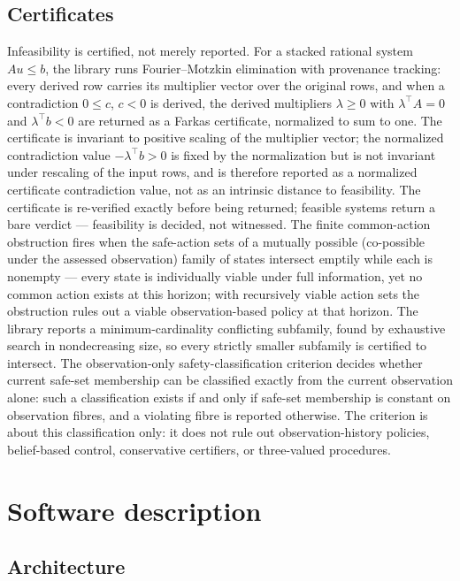 \documentclass[3p,11pt]{elsarticle}
\begin{document}
\subsection{Certificates}\label{sec:certificates}

Infeasibility is certified, not merely reported. For a stacked rational
system $A u \leq b$, the library runs Fourier--Motzkin elimination with
provenance tracking: every derived row carries its multiplier vector over
the original rows, and when a contradiction $0 \leq c$, $c < 0$ is derived,
the derived multipliers $\lambda \geq 0$ with $\lambda^{\top} A = 0$ and
$\lambda^{\top} b < 0$ are returned as a Farkas certificate, normalized to
sum to one. The certificate is invariant to positive scaling of the
multiplier vector; the normalized contradiction value
$-\lambda^{\top} b > 0$ is fixed by the normalization but is not
invariant under rescaling of the input rows, and is therefore reported
as a normalized certificate contradiction value, not as an intrinsic
distance to feasibility. The certificate is
re-verified exactly before being returned; feasible systems return a
bare verdict --- feasibility is decided, not witnessed. The finite
common-action obstruction fires when the safe-action sets of a mutually
possible (co-possible under the assessed observation) family of states
intersect emptily while each is nonempty --- every state is individually
viable under full information, yet no common action exists at this
horizon; with recursively viable action sets the obstruction rules out a
viable observation-based policy at that horizon. The library reports a
minimum-cardinality conflicting subfamily, found by exhaustive search in
nondecreasing size, so every strictly smaller subfamily is certified to
intersect. The observation-only safety-classification criterion decides
whether current safe-set membership can be classified exactly from the
current observation alone: such a classification exists if and only if
safe-set membership is constant on observation fibres, and a violating
fibre is reported otherwise. The criterion is about this classification
only: it does not rule out observation-history policies, belief-based
control, conservative certifiers, or three-valued procedures.

\section{Software description}\label{sec:software}

\subsection{Architecture}\label{sec:architecture}
\end{document}
